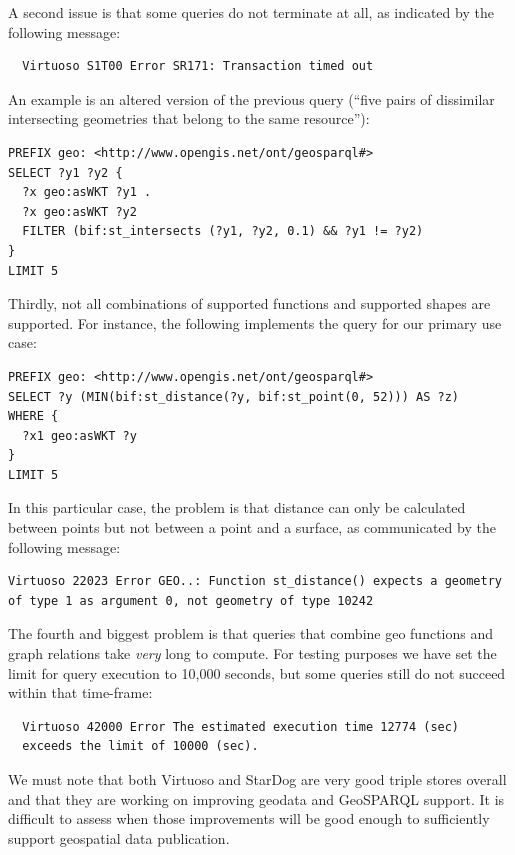 \documentclass[a4paper]{scrartcl}
\begin{document}
A second issue is that some queries do not terminate at all, as
indicated by the following message:

\begin{verbatim}
  Virtuoso S1T00 Error SR171: Transaction timed out
\end{verbatim}

An example is an altered version of the previous query (``five pairs
of dissimilar intersecting geometries that belong to the same
resource''):

\begin{verbatim}
PREFIX geo: <http://www.opengis.net/ont/geosparql#>
SELECT ?y1 ?y2 {
  ?x geo:asWKT ?y1 .
  ?x geo:asWKT ?y2
  FILTER (bif:st_intersects (?y1, ?y2, 0.1) && ?y1 != ?y2)
}
LIMIT 5
\end{verbatim}

Thirdly, not all combinations of supported functions and supported
shapes are supported.  For instance, the following implements the
query for our primary use case:

\begin{verbatim}
PREFIX geo: <http://www.opengis.net/ont/geosparql#>
SELECT ?y (MIN(bif:st_distance(?y, bif:st_point(0, 52))) AS ?z)
WHERE {
  ?x1 geo:asWKT ?y
}
LIMIT 5
\end{verbatim}

In this particular case, the problem is that distance can only be
calculated between points but not between a point and a surface, as
communicated by the following message:

\begin{verbatim}
Virtuoso 22023 Error GEO..: Function st_distance() expects a geometry
of type 1 as argument 0, not geometry of type 10242
\end{verbatim}

The fourth and biggest problem is that queries that combine geo
functions and graph relations take \emph{very} long to compute.  For
testing purposes we have set the limit for query execution to 10,000
seconds, but some queries still do not succeed within that time-frame:

\begin{verbatim}
  Virtuoso 42000 Error The estimated execution time 12774 (sec)
  exceeds the limit of 10000 (sec).
\end{verbatim}

We must note that both Virtuoso and StarDog are very good triple
stores overall and that they are working on improving geodata and
GeoSPARQL support.  It is difficult to assess when those improvements
will be good enough to sufficiently support geospatial data
publication.
\end{document}
